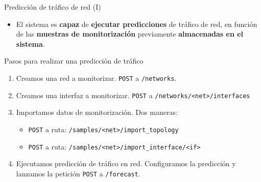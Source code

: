 \documentclass[aspectratio=169,xcolor=dvipsnames]{beamer}
\begin{document}
	\begin{frame}{Predicción de tráfico de red (I)}
		\begin{itemize}
			\item El sistema es \textbf{capaz} de \textbf{ejecutar predicciones} de tráfico de red, en función de las \textbf{muestras de monitorización} previamente \textbf{almacenadas en el sistema}.
		\end{itemize}
	
		\begin{exampleblock}{Pasos para realizar una predicción de tráfico}
			\begin{enumerate}
				\item Creamos una red a monitorizar. \texttt{POST} a \texttt{/networks}.
				
				\item Creamos una interfaz a monitorizar. \texttt{POST} a \texttt{/networks/<net>/interfaces}
				
				\item Importamos datos de monitorización.  Dos maneras: 
				\begin{itemize}
					\item \texttt{POST} a ruta: \texttt{/samples/<net>/import\_topology}
					
					\item \texttt{POST} a ruta: \texttt{/samples/<net>/import\_interface/<if>}
				\end{itemize}
			
				\item Ejecutamos predicción de tráfico en red. Configuramos la predicción y lanzamos la petición \texttt{POST} a \texttt{/forecast}.
			\end{enumerate}
		\end{exampleblock}
	\end{frame}
	
	
\end{document}
